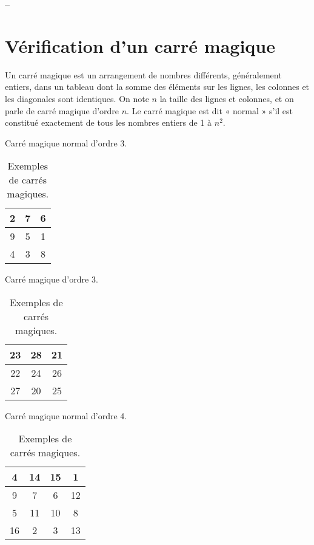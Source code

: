 

\usepackage{subcaption}

  


\begin{center}
{\Large\bf {\type} \no {\numero} -- \descrip}
\end{center}

\section{Vérification d'un carré magique}

Un carré magique est un arrangement de nombres différents, généralement entiers, dans un tableau dont la somme des éléments sur les lignes, les colonnes et les diagonales sont identiques. On note $n$ la taille des lignes et colonnes, et on parle de carré magique d'ordre $n$. Le carré magique est dit « normal » s'il est constitué exactement de tous les nombres entiers de 1 à $n^2$.

\begin{table}[!htb]
     \begin{subtable}{.33\linewidth}
      \centering
        \caption{Carré magique normal d'ordre 3.}
	  \begin{tabular}[c]{|c|c|c|}\hline
	  2 & 7 & 6 \\\hline
	  9 & 5 & 1 \\\hline
	  4 & 3 & 8 \\\hline
	  \end{tabular}
    \end{subtable}%
    \begin{subtable}{.33\linewidth}
      \centering
        \caption{Carré magique d'ordre 3.}
	  \begin{tabular}[c]{|c|c|c|}\hline
	  23 & 28 & 21 \\\hline
	  22 & 24 & 26 \\\hline
	  27 & 20 & 25 \\\hline
	  \end{tabular}
    \end{subtable}%
    \begin{subtable}{.33\linewidth}
      \centering
        \caption{Carré magique normal d'ordre 4.}
	  \begin{tabular}[c]{|c|c|c|c|}\hline
	  4 & 14 & 15 &  1 \\\hline
	  9 &  7 &  6 & 12 \\\hline
	  5 & 11 & 10 &  8 \\\hline
	 16 &  2 &  3 & 13 \\\hline	  
	  \end{tabular}
    \end{subtable}
\caption{Exemples de carrés magiques.}
\label{tab:carresmagiques}
\end{table}


